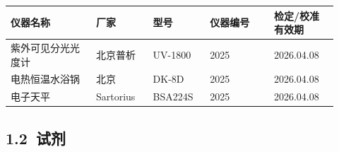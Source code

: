 \documentclass[UTF8,10pt,a4paper,fontset=fandol]{ctexart}
\newcommand{\fieldvalue}[1]{#1}
\newcommand{\handwritten}[1]{#1}
\begin{document}
\begin{tabular}{|p{0.24\linewidth}|p{0.16\linewidth}|p{0.16\linewidth}|p{0.18\linewidth}|p{0.18\linewidth}|}
\hline
仪器名称 & 厂家 & 型号 & 仪器编号 & 检定/校准有效期 \\
\hline
紫外可见分光光度计 &
\fieldvalue{\handwritten{北京普析}} &
\fieldvalue{\handwritten{UV-1800}} &
\fieldvalue{\handwritten{2025}} &
\fieldvalue{\handwritten{2026.04.08}} \\
\hline
电热恒温水浴锅 &
\fieldvalue{\handwritten{北京}} &
\fieldvalue{\handwritten{DK-8D}} &
\fieldvalue{\handwritten{2025}} &
\fieldvalue{\handwritten{2026.04.08}} \\
\hline
电子天平 &
\fieldvalue{\handwritten{Sartorius}} &
\fieldvalue{\handwritten{BSA224S}} &
\fieldvalue{\handwritten{2025}} &
\fieldvalue{\handwritten{2026.04.08}} \\
\hline
\end{tabular}

\subsection*{1.2\ 试剂}
\end{document}
